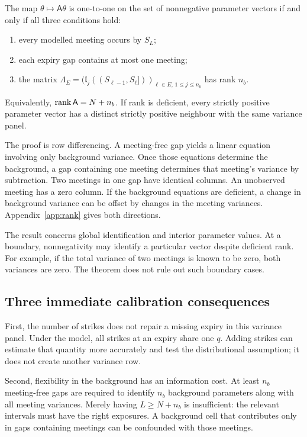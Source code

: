 \begin{theorem}\label{thm:rank}
The map $\theta\mapsto\mathsf A\theta$ is one-to-one on the set of nonnegative parameter vectors if and only if all three conditions hold:
\begin{enumerate}
\item every modelled meeting occurs by $S_L$;
\item each expiry gap contains at most one meeting;
\item the matrix $\Lambda_E=(\mathfrak l_j((S_{\ell-1},S_\ell]))_{\ell\in E,\,1\leq j\leq n_b}$ has rank $n_b$.
\end{enumerate}
Equivalently, $\operatorname{rank}\mathsf A=N+n_b$. If rank is deficient, every strictly positive parameter vector has a distinct strictly positive neighbour with the same variance panel.
\end{theorem}
The proof is row differencing. A meeting-free gap yields a linear equation involving only background variance. Once those equations determine the background, a gap containing one meeting determines that meeting's variance by subtraction. Two meetings in one gap have identical columns. An unobserved meeting has a zero column. If the background equations are deficient, a change in background variance can be offset by changes in the meeting variances. Appendix~\ref{app:rank} gives both directions.

The result concerns global identification and interior parameter values. At a boundary, nonnegativity may identify a particular vector despite deficient rank. For example, if the total variance of two meetings is known to be zero, both variances are zero. The theorem does not rule out such boundary cases.

\subsection{Three immediate calibration consequences}
First, the number of strikes does not repair a missing expiry in this variance panel. Under the model, all strikes at an expiry share one $q$. Adding strikes can estimate that quantity more accurately and test the distributional assumption; it does not create another variance row.

Second, flexibility in the background has an information cost. At least $n_b$ meeting-free gaps are required to identify $n_b$ background parameters along with all meeting variances. Merely having $L\geq N+n_b$ is insufficient: the relevant intervals must have the right exposures. A background cell that contributes only in gaps containing meetings can be confounded with those meetings.

